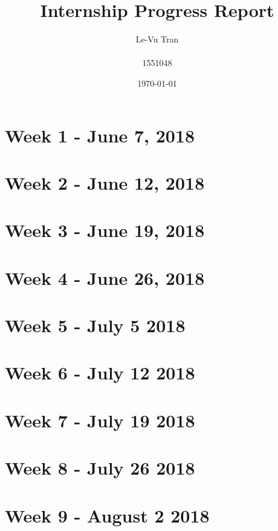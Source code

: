 \documentclass[a4paper]{report}
\title{Internship Progress Report}
\author{Le-Vu Tran\\\\1551048}
\date{\today}
\begin{document}
\maketitle

\tableofcontents

\iffalse
\fi
\chapter{Week 1 - June 7, 2018}


\chapter{Week 2 - June 12, 2018}


\chapter{Week 3 - June 19, 2018}


\chapter{Week 4 - June 26, 2018}


\chapter{Week 5 - July 5 2018}


\chapter{Week 6 - July 12 2018}


\chapter{Week 7 - July 19 2018}


\chapter{Week 8 - July 26 2018}


\chapter{Week 9 - August 2 2018}

\end{document}
